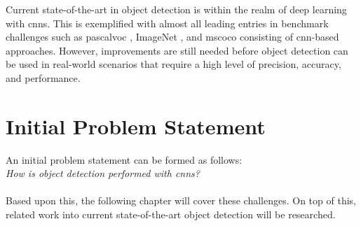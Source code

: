 Current state-of-the-art in object detection is within the realm of deep learning with \glspl{cnn}. This is exemplified with almost all leading entries in benchmark challenges such as \gls{pascalvoc} \cite{pascalvoc2012}, ImageNet \cite{imagenet}, and \gls{mscoco} \cite{mscoco} consisting of \gls{cnn}-based approaches. However, improvements are still needed before object detection can be used in real-world scenarios that require a high level of precision, accuracy, and performance. 

\section{Initial Problem Statement}

\begin{comment}
	- what are specific problems within object detection?
	- 
\end{comment}

An initial problem statement can be formed as follows: \\

\textit{How is object detection performed with \glspl{cnn}?} \\ \\
Based upon this, the following chapter will cover these challenges. On top of this, related work into current state-of-the-art object detection will be researched.
